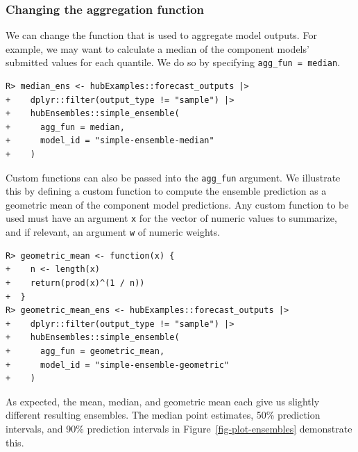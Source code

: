 \documentclass[
  article,
  shortnames,
  notitle]{jss}
\begin{document}
\subsubsection{Changing the aggregation
function}\label{changing-the-aggregation-function}

We can change the function that is used to aggregate model outputs. For
example, we may want to calculate a median of the component models'
submitted values for each quantile. We do so by specifying
\texttt{agg\_fun\ =\ median}.

\begin{verbatim}
R> median_ens <- hubExamples::forecast_outputs |>
+    dplyr::filter(output_type != "sample") |>
+    hubEnsembles::simple_ensemble(
+      agg_fun = median,
+      model_id = "simple-ensemble-median"
+    )
\end{verbatim}

Custom functions can also be passed into the \texttt{agg\_fun} argument.
We illustrate this by defining a custom function to compute the ensemble
prediction as a geometric mean of the component model predictions. Any
custom function to be used must have an argument \texttt{x} for the
vector of numeric values to summarize, and if relevant, an argument
\texttt{w} of numeric weights.

\begin{verbatim}
R> geometric_mean <- function(x) {
+    n <- length(x)
+    return(prod(x)^(1 / n))
+  }
R> geometric_mean_ens <- hubExamples::forecast_outputs |>
+    dplyr::filter(output_type != "sample") |>
+    hubEnsembles::simple_ensemble(
+      agg_fun = geometric_mean,
+      model_id = "simple-ensemble-geometric"
+    )
\end{verbatim}

As expected, the mean, median, and geometric mean each give us slightly
different resulting ensembles. The median point estimates, 50\%
prediction intervals, and 90\% prediction intervals in
Figure~\ref{fig-plot-ensembles} demonstrate this.
\end{document}

